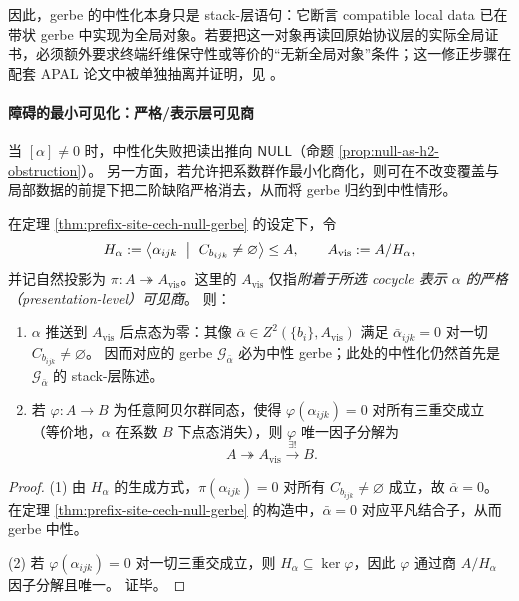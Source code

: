 \begin{remark}[终端纤维保守性的额外角色]\label{rem:prefix-site-gerbe-neutrality-conservativity}
因此，gerbe 的中性化本身只是 stack-层语句：它断言 compatible local data 已在带状 gerbe 中实现为全局对象。若要把这一对象再读回原始协议层的实际全局证书，必须额外要求终端纤维保守性或等价的“无新全局对象”条件；这一修正步骤在配套 APAL 论文中被单独抽离并证明，见 \cite{MaZhang2026StateForcingSemantics}。
\end{remark}

\paragraph{障碍的最小可见化：严格/表示层可见商}
当 \([\alpha]\neq 0\) 时，中性化失败把读出推向 \(\mathsf{NULL}\)（命题 \ref{prop:null-as-h2-obstruction}）。
另一方面，若允许把系数群作最小化商化，则可在不改变覆盖与局部数据的前提下把二阶缺陷严格消去，从而将 gerbe 归约到中性情形。

\begin{proposition}\label{prop:prefix-site-min-visible-quotient}
在定理 \ref{thm:prefix-site-cech-null-gerbe} 的设定下，令
\[
H_\alpha:=\bigl\langle \alpha_{ijk}\ \bigm|\ C_{b_{ijk}}\neq\varnothing \bigr\rangle\le A,
\qquad
A_{\mathrm{vis}}:=A/H_\alpha,
\]
并记自然投影为 \(\pi:A\twoheadrightarrow A_{\mathrm{vis}}\)。这里的 \(A_{\mathrm{vis}}\) 仅指\emph{附着于所选 cocycle 表示 \(\alpha\) 的严格（presentation-level）可见商}。
则：
\begin{enumerate}
  \item \(\alpha\) 推送到 \(A_{\mathrm{vis}}\) 后点态为零：其像 \(\bar\alpha\in Z^2(\{b_i\},A_{\mathrm{vis}})\) 满足 \(\bar\alpha_{ijk}=0\) 对一切 \(C_{b_{ijk}}\neq\varnothing\)。
  因而对应的 gerbe \(\mathcal{G}_{\bar\alpha}\) 必为中性 gerbe；此处的中性化仍然首先是 \(\mathcal G_{\bar\alpha}\) 的 stack-层陈述。
  \item 若 \(\varphi:A\to B\) 为任意阿贝尔群同态，使得 \(\varphi(\alpha_{ijk})=0\) 对所有三重交成立（等价地，\(\alpha\) 在系数 \(B\) 下点态消失），则 \(\varphi\) 唯一因子分解为
  \[
  A\twoheadrightarrow A_{\mathrm{vis}}\xrightarrow{\ \exists!\ } B.
  \]
\end{enumerate}
\end{proposition}

\begin{proof}
(1) 由 \(H_\alpha\) 的生成方式，\(\pi(\alpha_{ijk})=0\) 对所有 \(C_{b_{ijk}}\neq\varnothing\) 成立，故 \(\bar\alpha=0\)。
在定理 \ref{thm:prefix-site-cech-null-gerbe} 的构造中，\(\bar\alpha=0\) 对应平凡结合子，从而 gerbe 中性。
\par
(2) 若 \(\varphi(\alpha_{ijk})=0\) 对一切三重交成立，则 \(H_\alpha\subseteq\ker\varphi\)，因此 \(\varphi\) 通过商 \(A/H_\alpha\) 因子分解且唯一。
证毕。
\end{proof}

